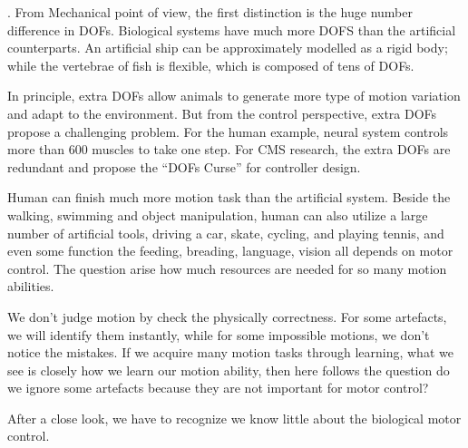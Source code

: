 \begin{itemize}
.
From Mechanical point of view, the first distinction is the huge number difference in DOFs. 
Biological systems have much more DOFS than the artificial counterparts.
An artificial ship can be approximately modelled as a rigid body; while the vertebrae of fish is flexible, which is composed of tens of DOFs.


In principle, extra DOFs allow animals to generate more type of motion variation and adapt to the environment. 
But from the control perspective, extra DOFs propose a challenging problem. 
For the human example, neural system controls more than 600 muscles to take one step.
For CMS research, the extra DOFs are redundant and propose the ``DOFs Curse'' for controller design.
 
Human can finish much more motion task than the artificial system.
Beside the walking, swimming and object manipulation, human can also utilize a large number of artificial tools, driving a car, skate, cycling, and playing tennis, and even some function the feeding, breading, language, vision all depends on motor control. 
The  question arise how much resources are needed for so many motion abilities.

We don’t judge motion by check the physically correctness.
For some artefacts, we will identify them instantly, while for some impossible motions, we don’t notice the mistakes. 
If we acquire many motion tasks through learning, what we see is closely how we learn our motion ability, then here follows the  question do we ignore some artefacts because they are not important for motor control?
\end{itemize}
After a close look, we have to recognize we know little about the biological motor control.

